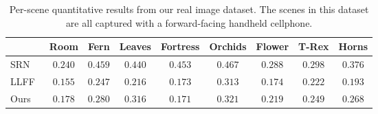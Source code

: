 \documentclass[runningheads]{llncs}
\begin{document}
\begin{table}[t]
{\begin{tabular}{l|cccccccc}
& Room & Fern & Leaves & Fortress & Orchids & Flower & T-Rex & Horns \\
\hline
SRN~\cite{srn}            & $0.240$ & $0.459$ & $0.440$ & $0.453$ & $0.467$ & $0.288$ & $0.298$ & $0.376$ \\
LLFF~\cite{mildenhall19}  & $\mathbf{0.155}$ & $\mathbf{0.247}$ & $\mathbf{0.216}$ & $0.173$ & $\mathbf{0.313}$ & $\mathbf{0.174}$ & $\mathbf{0.222}$ & $\mathbf{0.193}$ \\
Ours                      & $0.178$ & $0.280$ & $0.316$ & $\mathbf{0.171}$ & $0.321$ & $0.219$ & $0.249$ & $0.268$ \\
\hline
\end{tabular}
} \vspace{2mm}
\caption{Per-scene quantitative results from our real image dataset. The scenes in this dataset are all captured with a forward-facing handheld cellphone.
}
\label{table:suppresults3}  
\end{table}
\setlength{\tabcolsep}{1.4pt}
\end{document}
